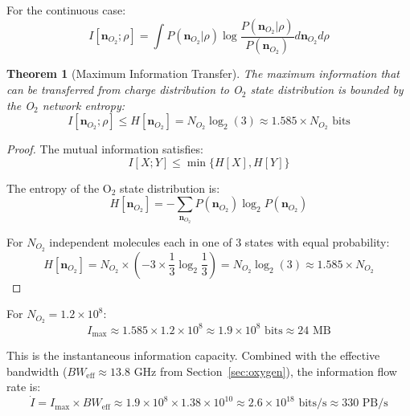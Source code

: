 \documentclass[twocolumn,10pt,aps,prd,superscriptaddress,floatfix,nofootinbib]{revtex4-2}
\newtheorem{theorem}{Theorem}[section]
\theoremstyle{remark}
\begin{document}
For the continuous case:
\begin{equation}
I[\mathbf{n}_{O_2}; \rho] = \int P(\mathbf{n}_{O_2}|\rho) \log\frac{P(\mathbf{n}_{O_2}|\rho)}{P(\mathbf{n}_{O_2})} d\mathbf{n}_{O_2} d\rho
\end{equation}

\begin{theorem}[Maximum Information Transfer]
\label{thm:max_information}
The maximum information that can be transferred from charge distribution to O$_2$ state distribution is bounded by the O$_2$ network entropy:
\begin{equation}
I[\mathbf{n}_{O_2}; \rho] \leq H[\mathbf{n}_{O_2}] = N_{O_2} \log_2(3) \approx 1.585 \times N_{O_2} \text{ bits}
\label{eq:max_info_bound}
\end{equation}
\end{theorem}

\begin{proof}
The mutual information satisfies:
\begin{equation}
I[X; Y] \leq \min\{H[X], H[Y]\}
\end{equation}

The entropy of the O$_2$ state distribution is:
\begin{equation}
H[\mathbf{n}_{O_2}] = -\sum_{\mathbf{n}_{O_2}} P(\mathbf{n}_{O_2}) \log_2 P(\mathbf{n}_{O_2})
\end{equation}

For $N_{O_2}$ independent molecules each in one of 3 states with equal probability:
\begin{equation}
H[\mathbf{n}_{O_2}] = N_{O_2} \times (-3 \times \frac{1}{3}\log_2\frac{1}{3}) = N_{O_2} \log_2(3) \approx 1.585 \times N_{O_2}
\end{equation}
\end{proof}

For $N_{O_2} = 1.2 \times 10^{8}$:
\begin{equation}
I_{\mathrm{max}} \approx 1.585 \times 1.2 \times 10^{8} \approx 1.9 \times 10^{8} \text{ bits} \approx 24 \text{ MB}
\end{equation}

This is the instantaneous information capacity. Combined with the effective bandwidth ($BW_{\mathrm{eff}} \approx 13.8$ GHz from Section~\ref{sec:oxygen}), the information flow rate is:
\begin{equation}
\dot{I} = I_{\mathrm{max}} \times BW_{\mathrm{eff}} \approx 1.9 \times 10^{8} \times 1.38 \times 10^{10} \approx 2.6 \times 10^{18} \text{ bits/s} \approx 330 \text{ PB/s}
\end{equation}
\end{document}
